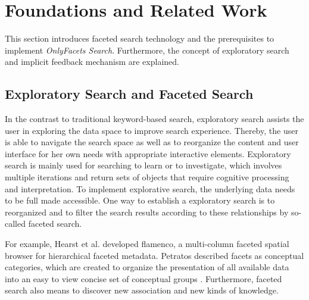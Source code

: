 
\chapter{Foundations and Related Work}


This section introduces faceted search technology and the prerequisites to implement {\it OnlyFacets Search}. Furthermore, the concept of exploratory search and implicit feedback mechanism are explained.

\section{Exploratory Search and Faceted Search}

In the contrast to traditional keyword-based search, exploratory search assists the user in exploring the data space to improve search experience. Thereby, the user is able to navigate the search space as well as to reorganize the content and user interface for her own needs with appropriate interactive elements. Exploratory search is mainly used for searching to learn or to investigate, which involves multiple iterations and return sets of objects that require cognitive processing and interpretation\cite{Marchionini2006}. To implement explorative search, the underlying data needs to be full made accessible. One way to establish a exploratory search is to reorganized and to filter the search results according to these relationships by so-called faceted search.

For example, Hearst et al. developed flamenco, a multi-column faceted spatial browser for hierarchical faceted metadata\cite{Hearst2006}. Petratos described facets as conceptual categories, which are created to organize the presentation of all available data into an easy to view concise set of conceptual groups \cite{Petratos2008}. Furthermore, faceted search also means to discover new association and new kinds of knowledge.


